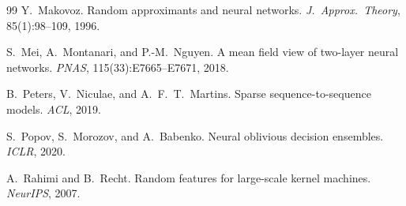 \documentclass[11pt,a4paper]{article}
\theoremstyle{definition}
\theoremstyle{remark}
\begin{document}
\begin{thebibliography}{99}
Y.~Makovoz.
\newblock Random approximants and neural networks.
\newblock \emph{J.~Approx.\ Theory},
  85(1):98--109, 1996.

S.~Mei, A.~Montanari, and P.-M.~Nguyen.
\newblock A mean field view of two-layer
  neural networks.
\newblock \emph{PNAS}, 115(33):E7665--E7671, 2018.

B.~Peters, V.~Niculae, and
A.~F.~T.~Martins.
\newblock Sparse sequence-to-sequence models.
\newblock \emph{ACL}, 2019.

S.~Popov, S.~Morozov, and A.~Babenko.
\newblock Neural oblivious decision ensembles.
\newblock \emph{ICLR}, 2020.

A.~Rahimi and B.~Recht.
\newblock Random features for large-scale
  kernel machines.
\newblock \emph{NeurIPS}, 2007.

\end{thebibliography}
\end{document}
